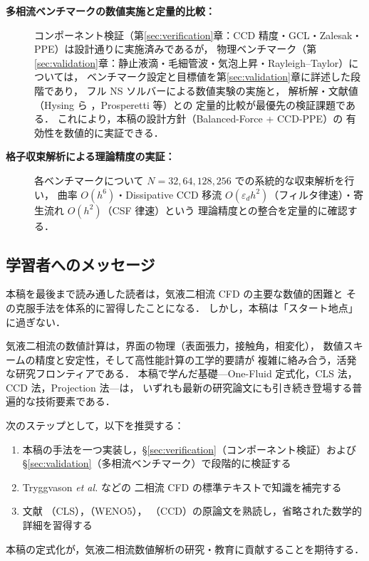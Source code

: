 \begin{description}
  \item[\textbf{多相流ベンチマークの数値実施と定量的比較：}]
        コンポーネント検証（第\ref{sec:verification}章：CCD 精度・GCL・Zalesak・PPE）は設計通りに実施済みであるが，
        物理ベンチマーク（第\ref{sec:validation}章：静止液滴・毛細管波・気泡上昇・Rayleigh--Taylor）については，
        ベンチマーク設定と目標値を第\ref{sec:validation}章に詳述した段階であり，
        フル NS ソルバーによる数値実験の実施と，
        解析解・文献値（Hysing ら \cite{Hysing2009}，Prosperetti \cite{Prosperetti1981} 等）との
        定量的比較が最優先の検証課題である．
        これにより，本稿の設計方針（Balanced-Force + CCD-PPE）の
        有効性を数値的に実証できる．

  \item[\textbf{格子収束解析による理論精度の実証：}]
        各ベンチマークについて $N = 32, 64, 128, 256$ での系統的な収束解析を行い，
        曲率 $O(h^6)$・Dissipative CCD 移流 $O(\varepsilon_d h^2)$（フィルタ律速）・寄生流れ $O(h^2)$（CSF 律速）という
        理論精度との整合を定量的に確認する．
\end{description}

\subsection{学習者へのメッセージ}
\label{sec:message}

本稿を最後まで読み通した読者は，気液二相流 CFD の主要な数値的困難と
その克服手法を体系的に習得したことになる．
しかし，本稿は「スタート地点」に過ぎない．

気液二相流の数値計算は，界面の物理（表面張力，接触角，相変化），
数値スキームの精度と安定性，そして高性能計算の工学的要請が
複雑に絡み合う，活発な研究フロンティアである．
本稿で学んだ基礎—One-Fluid 定式化，CLS 法，CCD 法，Projection 法—は，
いずれも最新の研究論文にも引き続き登場する普遍的な技術要素である．

次のステップとして，以下を推奨する：
\begin{enumerate}
  \item 本稿の手法を一つ実装し，§\ref{sec:verification}（コンポーネント検証）および §\ref{sec:validation}（多相流ベンチマーク）で段階的に検証する
  \item Tryggvason \textit{et al.} \cite{Tryggvason2011} などの
        二相流 CFD の標準テキストで知識を補完する
  \item 文献 \cite{OlssonKreiss2005}（CLS），\cite{JiangShu1996}（WENO5），
        \cite{ChuFan1998}（CCD）の原論文を熟読し，省略された数学的詳細を習得する
\end{enumerate}

本稿の定式化が，気液二相流数値解析の研究・教育に貢献することを期待する．
